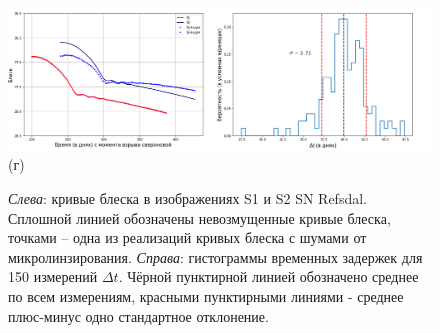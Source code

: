 \begin{figure}[H]
	\vfill
	\begin{minipage}[h]{1.0\linewidth}
    \centering	
    	\includegraphics[scale=0.40]{pics/fig4.png} \\ \centering (г) \\
	\end{minipage}
	
	\caption{\textit{Слева}: кривые блеска в изображениях S1 и S2 SN Refsdal. Сплошной линией обозначены невозмущенные кривые блеска, точками -- одна из реализаций кривых блеска с шумами от микролинзирования. \textit{Справа}: гистограммы временных задержек для 150 измерений $\Delta t$. Чёрной пунктирной линией обозначено среднее по всем измерениям, красными пунктирными линиями - среднее плюс-минус одно стандартное отклонение. \label{fig:proba}} 
\end{figure}